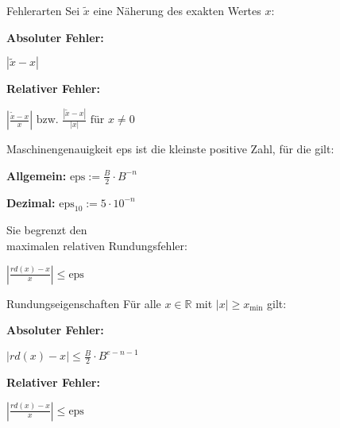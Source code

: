\begin{definition}{Fehlerarten}
Sei $\tilde{x}$ eine Näherung des exakten Wertes $x$:
\vspace{1mm}\\
\begin{minipage}[t]{0.45\textwidth}
    \textbf{Absoluter Fehler:} 
    \begin{center} $\left|\tilde{x}-x\right|$ \end{center}
\end{minipage}
\hspace{3mm}
\begin{minipage}[t]{0.5\textwidth}
    \textbf{Relativer Fehler:} 
    \begin{center} $\left|\frac{\tilde{x}-x}{x}\right| \text{ bzw. } \frac{|\tilde{x}-x|}{|x|} \text{ für } x \neq 0$ \end{center}
\end{minipage}
\end{definition}

\begin{lemma}{Maschinengenauigkeit} 
    eps ist die kleinste positive Zahl, für die gilt:
    \vspace{-3mm}\\
\begin{minipage}[b]{0.45\textwidth}
    \textbf{Allgemein:}  $\text{eps} := \frac{B}{2} \cdot B^{-n}$
\end{minipage}
\hspace{6mm}
\begin{minipage}[b]{0.45\textwidth}
    \textbf{Dezimal:}  $\text{eps}_{10} := 5 \cdot 10^{-n}$
\end{minipage}

\begin{minipage}[t]{0.6\textwidth}
    Sie begrenzt den\\ maximalen relativen Rundungsfehler:
\end{minipage}
\begin{minipage}{0.35\textwidth}
    \vspace{1mm}
    $\left|\frac{rd(x)-x}{x}\right| \leq \text{eps}$
\end{minipage}
\end{lemma}

\begin{corollary}{Rundungseigenschaften}
Für alle $x \in \mathbb{R}$ mit $|x| \geq x_{\text{min}}$ gilt:
\vspace{1mm}\\
\begin{minipage}[t]{0.45\textwidth}
    \textbf{Absoluter Fehler:}  
    \begin{center} $|rd(x) - x| \leq \frac{B}{2} \cdot B^{e-n-1}$ \end{center}
\end{minipage}
\hspace{3mm}
\begin{minipage}[t]{0.35\textwidth}
    \textbf{Relativer Fehler:}  
    \begin{center} $\left|\frac{rd(x)-x}{x}\right| \leq \text{eps}$ \end{center}
\end{minipage}
\end{corollary}

